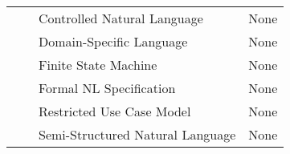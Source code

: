 \begin{table}[]
{\begin{tabular}{clll}
\multicolumn{1}{c|}{}                      &                                                      & Controlled Natural Language             & None                                                                                                                                                                                                                                                                                                                                      \\
\multicolumn{1}{c|}{}                      &                                                      & Domain-Specific Language                & None                                                                                                                                                                                                                                                                                                                                      \\
\multicolumn{1}{c|}{}                      &                                                      & Finite State Machine                    & None                                                                                                                                                                                                                                                                                                                                      \\
\multicolumn{1}{c|}{}                      &                                                      & Formal NL Specification                 & None                                                                                                                                                                                                                                                                                                                                      \\
\multicolumn{1}{c|}{}                      &                                                      & Restricted Use Case Model               & None                                                                                                                                                                                                                                                                                                                                      \\
\multicolumn{1}{c|}{}                      &                                                      & Semi-Structured Natural Language        & None                                                                                                                                                                                                                                                                                                                                      \\

\end{tabular}}
\end{table}
